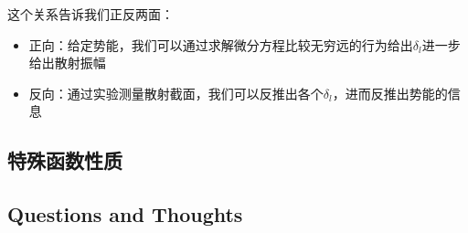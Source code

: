 \bigskip
{}

这个关系告诉我们正反两面：
\begin{itemize}
  \item 正向：给定势能，我们可以通过求解微分方程比较无穷远的行为给出$ \delta_l $进一步给出散射振幅
  \item 反向：通过实验测量散射截面，我们可以反推出各个$ \delta_l $，进而反推出势能的信息
\end{itemize}

\subsection{特殊函数性质}

\bigskip
{}

\bigskip
{}

\subsection{Questions and Thoughts}
